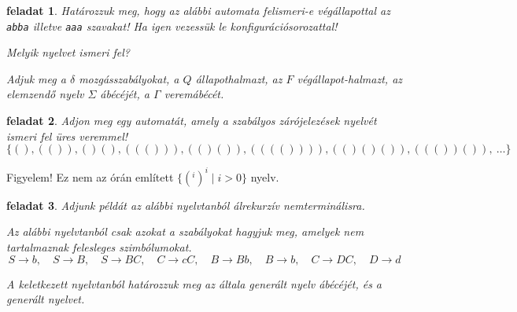 \documentclass[a4paper]{article}
\newtheorem{feladat}{feladat}[section]
\begin{document}
\begin{feladat}{}
Határozzuk meg, hogy az alábbi automata felismeri-e végállapottal az
\verb|abba| illetve \verb+aaa+ szavakat!
Ha igen vezessük le konfigurációsorozattal!

Melyik nyelvet ismeri fel?

Adjuk meg a $\delta$  mozgásszabályokat, a $Q$ állapothalmazt, az $F$
végállapot-halmazt, az elemzendő nyelv $\Sigma$ ábécéjét, a $\Gamma$ veremábécét.

\end{feladat}

\begin{feladat}{}
  Adjon meg egy automatát, amely a szabályos zárójelezések nyelvét
  ismeri fel üres veremmel!
  \[\{ (), (()), ()(), ((())), (()()), (((()))), (()()()), ((())()),\: \dots \}\]
\end{feladat}

Figyelem! Ez nem az órán említett $\{(^i)^i \mid i>0\}$ nyelv.

\begin{feladat}
Adjunk példát az alábbi nyelvtanból álrekurzív nemterminálisra.

Az alábbi nyelvtanból csak azokat a szabályokat hagyjuk meg, amelyek nem
tartalmaznak felesleges szimbólumokat.
\[ S\to b,\quad  S\to B,\quad  S\to BC,\quad  C\to cC,\quad  B\to Bb,\quad  B\to b,\quad  C\to DC,\quad  D\to d\]

A keletkezett nyelvtanból határozzuk meg az általa generált nyelv ábécéjét, és a generált nyelvet.
\end{feladat}
\end{document}
